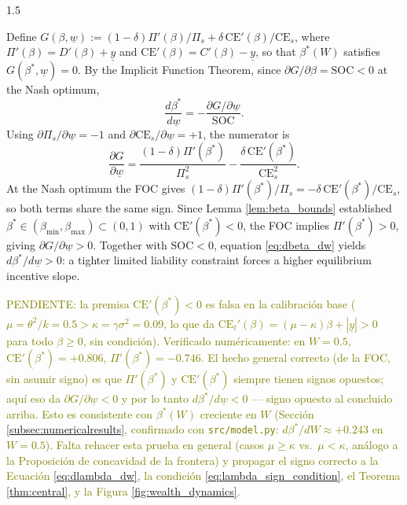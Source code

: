 \documentclass[12pt]{article}
\theoremstyle{definition}
\theoremstyle{plain}
\begin{document}
\begin{spacing}{1.5}
\begin{appendices}
    Define $G(\beta,\underline{w}) := (1-\delta)\Pi'(\beta)/\Pi_s + \delta\,\mathrm{CE}'(\beta)/\mathrm{CE}_s$, where $\Pi'(\beta) = D'(\beta) + \underline{y}$ and $\mathrm{CE}'(\beta) = C'(\beta) - \underline{y}$, so that $\beta^*(W)$ satisfies $G(\beta^*,\underline{w}) = 0$. By the Implicit Function Theorem, since $\partial G/\partial\beta = \mathrm{SOC} < 0$ at the Nash optimum,
    \begin{equation}\label{eq:dbeta_dw}
    \frac{d\beta^*}{d\underline{w}} = -\frac{\partial G/\partial\underline{w}}{\mathrm{SOC}}.
    \end{equation}
    Using $\partial\Pi_s/\partial\underline{w} = -1$ and $\partial\mathrm{CE}_s/\partial\underline{w} = +1$, the numerator is
    \[
    \frac{\partial G}{\partial\underline{w}} = \frac{(1-\delta)\Pi'(\beta^*)}{\Pi_s^2} - \frac{\delta\,\mathrm{CE}'(\beta^*)}{\mathrm{CE}_s^2}.
    \]
    At the Nash optimum the FOC gives $(1-\delta)\Pi'(\beta^*)/\Pi_s = -\delta\,\mathrm{CE}'(\beta^*)/\mathrm{CE}_s$, so both terms share the same sign. Since Lemma \ref{lem:beta_bounds} established $\beta^* \in (\beta_{\min},\beta_{\max}) \subset (0,1)$ with $\mathrm{CE}'(\beta^*) < 0$, the FOC implies $\Pi'(\beta^*) > 0$, giving $\partial G/\partial\underline{w} > 0$. Together with $\mathrm{SOC} < 0$, equation \eqref{eq:dbeta_dw} yields $d\beta^*/d\underline{w} > 0$: a tighter limited liability constraint forces a higher equilibrium incentive slope.

    \textcolor{olive}{PENDIENTE: la premisa $\mathrm{CE}'(\beta^*)<0$ es falsa en la calibración base ($\mu=\theta^2/k=0.5 > \kappa=\gamma\sigma^2=0.09$, lo que da $\mathrm{CE}_t'(\beta)=(\mu-\kappa)\beta+|\underline y|>0$ para todo $\beta\ge0$, sin condición). Verificado numéricamente: en $W=0.5$, $\mathrm{CE}'(\beta^*)=+0.806$, $\Pi'(\beta^*)=-0.746$. El hecho general correcto (de la FOC, sin asumir signo) es que $\Pi'(\beta^*)$ y $\mathrm{CE}'(\beta^*)$ siempre tienen signos opuestos; aquí eso da $\partial G/\partial\underline w<0$ y por lo tanto $d\beta^*/d\underline w<0$ — signo opuesto al concluido arriba. Esto es consistente con $\beta^*(W)$ creciente en $W$ (Sección \ref{subsec:numericalresults}, confirmado con \texttt{src/model.py}: $d\beta^*/dW\approx+0.243$ en $W=0.5$). Falta rehacer esta prueba en general (casos $\mu\ge\kappa$ vs.\ $\mu<\kappa$, análogo a la Proposición de concavidad de la frontera) y propagar el signo correcto a la Ecuación \eqref{eq:dlambda_dw}, la condición \eqref{eq:lambda_sign_condition}, el Teorema \ref{thm:central}, y la Figura \ref{fig:wealth_dynamics}.}


\end{appendices}
\end{spacing}
\end{document}
